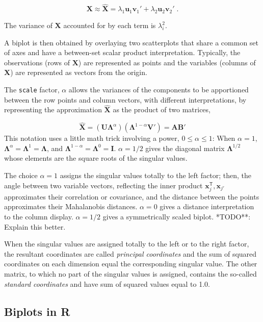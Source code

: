 \documentclass[
  letterpaper,
  10pt,
  krantz2]{krantz}
\begin{document}
\[
\mathbf{X} \approx \widehat{\mathbf{X}} = \lambda_1 \mathbf{u}_1 \mathbf{v}_1' + \lambda_2 \mathbf{u}_2 \mathbf{v}_2' \; .
\]

The variance of \(\mathbf{X}\) accounted for by each term is
\(\lambda_i^2\).

A biplot is then obtained by overlaying two scatterplots that share a
common set of axes and have a between-set scalar product interpretation.
Typically, the observations (rows of \(\mathbf{X}\)) are represented as
points and the variables (columns of \(\mathbf{X}\)) are represented as
vectors from the origin.

The \texttt{scale} factor, \(\alpha\) allows the variances of the
components to be apportioned between the row points and column vectors,
with different interpretations, by representing the approximation
\(\widehat{\mathbf{X}}\) as the product of two matrices,

\[
\widehat{\mathbf{X}} = (\mathbf{U} \mathbf{\Lambda}^\alpha) (\mathbf{\Lambda}^{1-\alpha} \mathbf{V}') = \mathbf{A} \mathbf{B}'
\] This notation uses a little math trick involving a power,
\(0 \le \alpha \le 1\): When \(\alpha = 1\),
\(\mathbf{\Lambda}^\alpha = \mathbf{\Lambda}^1  =\mathbf{\Lambda}\), and
\(\mathbf{\Lambda}^{1-\alpha} = \mathbf{\Lambda}^0  =\mathbf{I}\).
\(\alpha = 1/2\) gives the diagonal matrix \(\mathbf{\Lambda}^{1/2}\)
whose elements are the square roots of the singular values.

The choice \(\alpha = 1\) assigns the singular values totally to the
left factor; then, the angle between two variable vectors, reflecting
the inner product \(\mathbf{x}_j^\mathsf{T}, \mathbf{x}_{j'}\)
approximates their correlation or covariance, and the distance between
the points approximates their Mahalanobis distances. \(\alpha = 0\)
gives a distance interpretation to the column display. \(\alpha = 1/2\)
gives a symmetrically scaled biplot. *TODO**: Explain this better.

When the singular values are assigned totally to the left or to the
right factor, the resultant coordinates are called \emph{principal
coordinates} and the sum of squared coordinates on each dimension equal
the corresponding singular value. The other matrix, to which no part of
the singular values is assigned, contains the so-called \emph{standard
coordinates} and have sum of squared values equal to 1.0.

\subsection{Biplots in R}\label{biplots-in-r}
\end{document}
